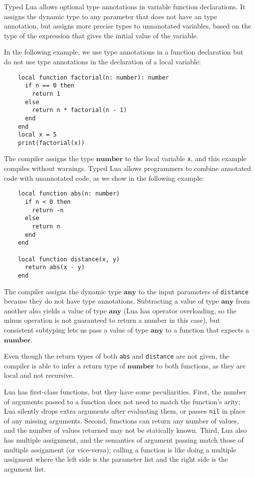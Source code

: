 \documentclass[preprint]{sig-alternate}
\newcommand{\Any}{\mathbf{any}}
\newcommand{\Number}{\mathbf{number}}
\begin{document}
Typed Lua allows optional type annotations in variable function
declarations. It assigns the dynamic type to any parameter that
does not have an type annotation, but assigns more precise
types to unnanotated variables, based on the type of the
expression that gives the initial value of the variable.

In the following example, we use type annotations in a function
declaration but do not use type annotations in the declaration of a
local variable:
\begin{verbatim}
    local function factorial(n: number): number
      if n == 0 then
        return 1
      else
        return n * factorial(n - 1)
      end
    end
    local x = 5
    print(factorial(x))
\end{verbatim}

The compiler assigns the type $\Number$ to the local variable \texttt{x},
and this example compiles without warnings. Typed Lua allows
programmers to combine annotated code with
unannotated code, as we show in the following example:
\begin{verbatim}
    local function abs(n: number)
      if n < 0 then
        return -n
      else
        return n
      end
    end

    local function distance(x, y)
      return abs(x - y)
    end
\end{verbatim}

The compiler assigns the dynamic type $\Any$ to the input
parameters of \texttt{distance} because they do not have type annotations.
Subtracting a value of type $\Any$ from another also yields a value of
type $\Any$ (Lua has operator overloading, so the minus operation
is not guaranteed to return a number in this case), but
consistent subtyping lets us pass a value of type $\Any$ to a
function that expects a $\Number$. 

Even though the return types
of both {\tt abs} and {\tt distance} are not given, the compiler is able to
infer a return type of $\Number$ to both functions, as they are
local and not recursive.

Lua has first-class functions, but they have some peculiarities. First,
the number of arguments passed to a function does not need to
match the function's arity; Lua silently drops extra arguments after
evaluating them, or passes {\tt nil} in place of any missing arguments.
Second, functions can return any number of values, and the number
of values returned may not be statically known. Third, Lua also has
multiple assignment, and the semantics of argument passing match
those of multiple assignment (or vice-versa); calling a function is like
doing a multiple assigment where the left side is the parameter list
and the right side is the argument list. 
\end{document}
